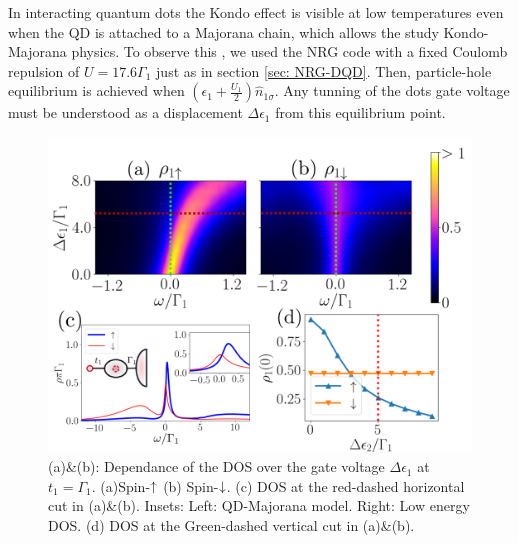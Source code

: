 In interacting quantum dots the Kondo effect is visible at low temperatures even when the QD is attached to a Majorana chain, which allows the study Kondo-Majorana physics. To observe this , we used the NRG code with a fixed Coulomb repulsion of $U = 17.6\Gamma_1$ just as in section \ref{sec: NRG-DQD}. Then, particle-hole equilibrium is achieved when $\left(\epsilon_{1}+\frac{U_1}{2}\right)\hat{n}_{1\sigma}$. Any tunning of the dots gate voltage must be understood as a displacement $\Delta \epsilon_1$ from this equilibrium point. 




 \begin{figure}[h]
 \centering
   \includegraphics[scale=0.57]{IMAGES/Majorana/NRG-FullED.png}
   \caption{ \label{fig:QD-ed}(a)\&(b): Dependance of the DOS over the gate voltage $\Delta \epsilon_1$ at $t_1 = \Gamma_1$. (a)Spin-$\uparrow$ (b) Spin-$\downarrow$. (c) DOS at the red-dashed horizontal cut in (a)\&(b). Insets: Left: QD-Majorana model. Right: Low energy DOS. (d) DOS at the Green-dashed vertical cut in (a)\&(b). \protect{} }
 \end{figure}



